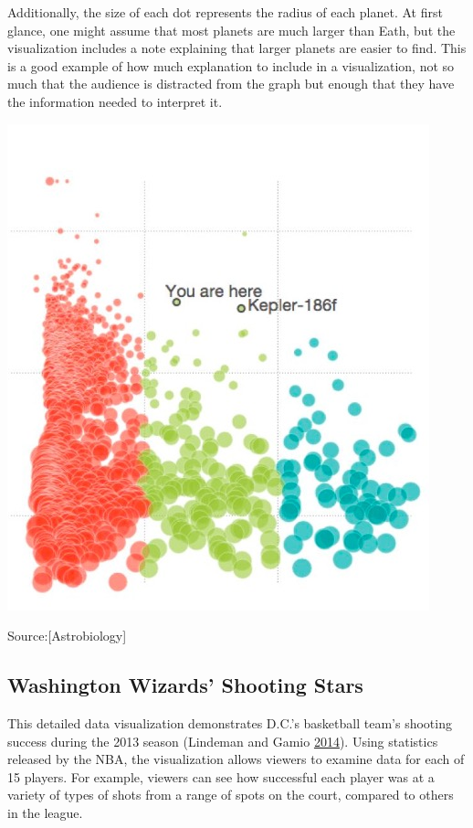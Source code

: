 \documentclass[]{book}
\begin{document}
Additionally, the size of each dot represents the radius of each planet. At first glance, one might assume that most planets are much larger than Eath, but the visualization includes a note explaining that larger planets are easier to find. This is a good example of how much explanation to include in a visualization, not so much that the audience is distracted from the graph but enough that they have the information needed to interpret it.

\includegraphics{images/planetnew.png}

Source:{[}Astrobiology{]}

\hypertarget{washington-wizards-shooting-stars}{%
\subsection{Washington Wizards' Shooting Stars}\label{washington-wizards-shooting-stars}}

This detailed data visualization demonstrates D.C.'s basketball team's shooting success during the 2013 season (Lindeman and Gamio \protect\hyperlink{ref-basketball}{2014}). Using statistics released by the NBA, the visualization allows viewers to examine data for each of 15 players. For example, viewers can see how successful each player was at a variety of types of shots from a range of spots on the court, compared to others in the league.
\end{document}
